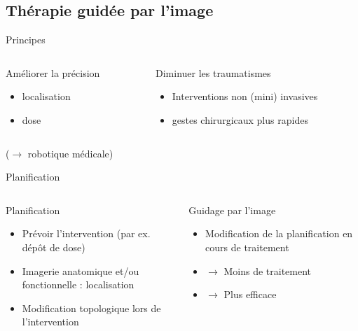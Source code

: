 \documentclass{beamer}
\begin{document}
\subsection{Thérapie guidée par l'image}
\begin{frame}{Principes}
\centering
  \begin{columns}[t]
 \begin{column}{0.5\textwidth}
\begin{block}{Améliorer la précision}
\begin{itemize}
  \item localisation
  \item dose
 \end{itemize}
\end{block}
 \end{column}
 \begin{column}{0.5\textwidth}
\begin{block}{Diminuer les traumatismes}
\begin{itemize}
  \item Interventions non (mini) invasives
  \item gestes chirurgicaux plus rapides
  \end{itemize}
\end{block}
\end{column}
\end{columns}
  (\small$\rightarrow$ robotique médicale)
\end{frame}
\begin{frame}{Planification}
 \centering
  \begin{columns}[t]
 \begin{column}{0.5\textwidth}
\begin{block}{Planification}
\begin{itemize}
 \item Prévoir l'intervention (par ex. dépôt de dose)
 \item Imagerie anatomique et/ou fonctionnelle : localisation
 \item Modification topologique lors de l'intervention
\end{itemize}\end{block}
 \end{column}
 \begin{column}{0.5\textwidth}
\begin{block}{Guidage par l'image}
\begin{itemize}
  \item Modification de la planification en cours de traitement
  \item $\rightarrow$ Moins de traitement
  \item $\rightarrow$ Plus efficace
  \end{itemize}
\end{block}
\end{column}
\end{columns}
\end{frame}
\end{document}
